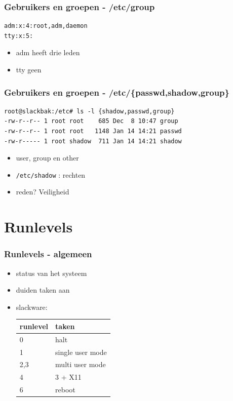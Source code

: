 \documentclass{beamer}
\begin{document}
\begin{frame}[fragile]
  \frametitle{Gebruikers en groepen - /etc/group}
  \begin{lstlisting}
adm:x:4:root,adm,daemon
tty:x:5:
  \end{lstlisting}
  \begin{itemize}
  \item<2-> adm heeft drie leden
  \item<3-> tty geen
  \end{itemize}
\end{frame}

\begin{frame}[fragile]
  \frametitle{Gebruikers en groepen - /etc/\{passwd,shadow,group\}}
  \begin{lstlisting}
root@slackbak:/etc# ls -l {shadow,passwd,group}
-rw-r--r-- 1 root root    685 Dec  8 10:47 group
-rw-r--r-- 1 root root   1148 Jan 14 14:21 passwd
-rw-r----- 1 root shadow  711 Jan 14 14:21 shadow
  \end{lstlisting}
  \begin{itemize}
  \item<2-> user, group en other
  \item<3-> \texttt{/etc/shadow} : rechten
  \item<4-> reden? Veiligheid
  \end{itemize}
\end{frame}

\section{Runlevels}

\begin{frame}
  \frametitle{Runlevels - algemeen}
  \begin{itemize}
  \item<1-> status van het systeem
  \item<2-> duiden taken aan
  \item<3-> slackware:\\
    \begin{tabular}[t]{ll}
      \hline
      runlevel & taken\\
      \hline
      0 & halt\\
      1 & single user mode\\
      2,3 & multi user mode\\
      4 & 3 + X11\\
      6 & reboot\\
    \end{tabular}
  \end{itemize}
\end{frame}
\end{document}
